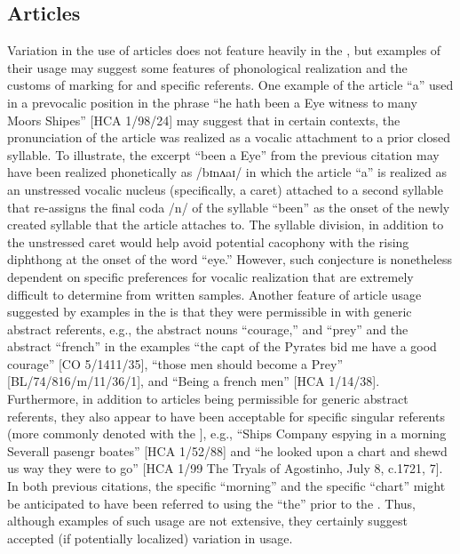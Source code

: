 \subsection{{Articles}}%

Variation in the use of  articles does not feature heavily in the , but examples of their usage may suggest some features of phonological realization and the customs of marking for  and specific referents. One example of the  article “a” used in a prevocalic position in the phrase “he hath been a Eye witness to many Moors Shipes” [HCA 1/98/24] may suggest that in certain contexts, the pronunciation of the article was realized as a vocalic attachment to a prior closed syllable. To illustrate, the excerpt “been a Eye” from the previous citation may have been realized phonetically as /b{ɪ}nʌ{aɪ/ in which the article “a” is realized as an unstressed vocalic nucleus (specifically, a caret) attached to a second syllable that re-assigns the final coda /n/ of the syllable “been” as the onset of the newly created syllable that the article attaches to. The syllable division, in addition to the unstressed caret would help avoid potential cacophony with the rising diphthong at the onset of the word “eye.” However, such conjecture is nonetheless dependent on specific preferences for vocalic realization that are extremely difficult to determine from written samples. Another feature of  article usage suggested by examples in the  is that they were permissible in  with generic abstract referents, e.g., the abstract nouns “courage,” and “prey” and the abstract  “french” in the examples} “the capt of the Pyrates bid me have a good courage” [CO 5/1411/35], “those men should become a Prey” [BL/74/816/m/11/36/1], and “Being a french men” [HCA 1/14/38]. Furthermore, in addition to  articles being {permissible for generic abstract referents, they also appear to have been acceptable for specific singular referents (more commonly denoted with the ], e.g.,} “Ships Company espying in a morning Severall pasengr boates” [HCA 1/52/88] and “he looked upon a chart and shewd us way they were to go” [HCA 1/99 The Tryals of Agostinho, July 8, c.1721, 7]. In both previous citations, the specific “morning” and the specific “chart” might be anticipated to have been referred to using the  “the” prior to the . Thus, although examples of such usage are not extensive, they certainly suggest accepted (if potentially localized) variation in usage. 

